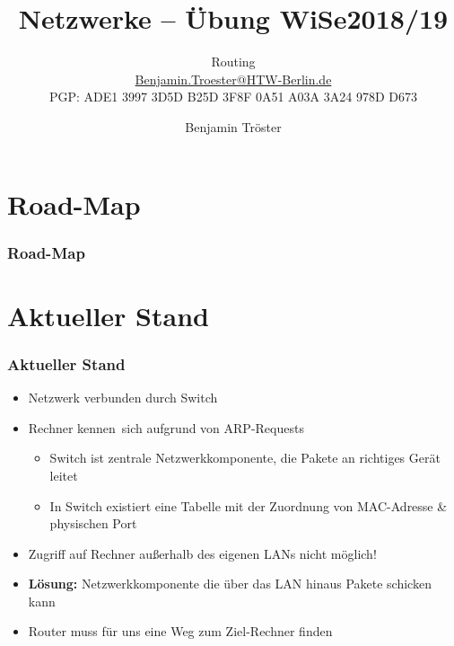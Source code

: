 \documentclass[xcolor=dvipsnames, aspectratio=169]{beamer}
\begin{document}

\title{Netzwerke -- Übung WiSe2018/19}
\subtitle{Routing\\
		\href{mailto:Benjamin.Troester@HTW-Berlin.de}{Benjamin.Troester@HTW-Berlin.de}\\
		PGP: ADE1 3997 3D5D B25D 3F8F 0A51 A03A 3A24 978D D673 }
\author{Benjamin Tröster}

\date{}

\begin{frame}
\titlepage

\end{frame}

\section*{Road-Map}
\begin{frame}
\frametitle{Road-Map}
\begin{multicols}{2}
  \tableofcontents
\end{multicols}
\end{frame}

\section{Aktueller Stand}
\begin{frame}
	\frametitle{Aktueller Stand}
	\begin{itemize}
		\item Netzwerk verbunden durch Switch
		\item Rechner \glqq kennen\grqq\ sich aufgrund von ARP-Requests
		\begin{itemize}
			\item Switch ist zentrale Netzwerkkomponente, die Pakete an richtiges Gerät leitet
			\item In Switch existiert eine Tabelle mit der Zuordnung von MAC-Adresse \& physischen Port
		\end{itemize}
		\item Zugriff auf Rechner außerhalb des eigenen LANs nicht möglich!
		\item \textbf{Lösung:} Netzwerkkomponente die über das LAN hinaus Pakete schicken kann
		\item Router muss für uns eine Weg zum Ziel-Rechner finden
	\end{itemize}
\end{frame}
\end{document}
